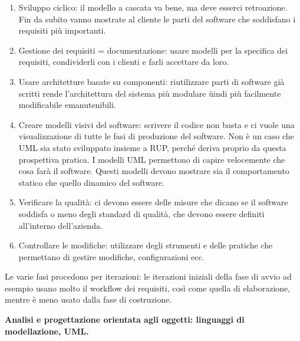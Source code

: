 \documentclass[answers, a4paper, 11pt]{exam}
\begin{document}
\begin{questions}
\begin{parts}
\begin{solution}
\begin{enumerate}
\begin{enumerate}
    \item Sviluppo ciclico: il modello a cascata va bene, ma deve esserci retroazione.
    Fin da subito vanno mostrate al cliente le parti del software che soddisfano i requisiti più importanti. 
    \item Gestione dei requisiti = documentazione: usare modelli per la specifica dei requisiti, condividerli con i clienti e farli accettare da loro.
    \item Usare architetture basate su componenti: riutilizzare parti di software già scritti rende l'architettura del sistema più modulare  ùindi più facilmente modificabile emanutenibili.
    \item Creare modelli visivi del software: scrivere il codice non basta e ci vuole una visualizzazione di tutte le fasi di produzione del software.
    Non è un caso che UML sia stato sviluppato insieme a RUP, perché deriva proprio da questa prospettiva pratica. 
    I modelli UML permettono di capire velocemente che cosa farà il software. 
    Questi modelli devono mostrare sia il comportamento statico che quello dinamico del software. 
    \item Verificare la qualità: ci devono essere delle misure che dicano se il software soddisfa o meno degli standard di qualità, che devono essere definiti all'interno dell'azienda.
    \item Controllare le modifiche: utilizzare degli strumenti e delle pratiche che permettano di gestire modifiche, configurazioni ecc. 
\end{enumerate}
\end{enumerate}
Le varie fasi procedono per iterazioni: le iterazioni iniziali della fase di avvio ad esempio usano molto il workflow dei requisiti, così come quella di elaborazione, mentre è meno usato dalla fase di costruzione. 
\end{solution}
\end{parts}

\question \textbf{Analisi e progettazione orientata agli oggetti: linguaggi di modellazione, UML.}
\end{questions}
\end{document}
